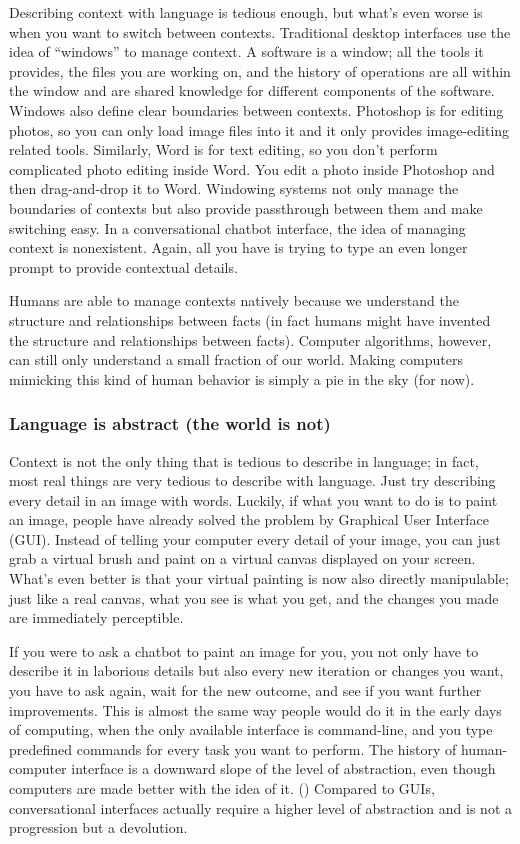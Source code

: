 \documentclass[12pt]{article}
\begin{document}
Describing context with language is tedious enough, but what's even worse is when you want to switch between contexts. Traditional desktop interfaces use the idea of ``windows'' to manage context. A software is a window; all the tools it provides, the files you are working on, and the history of operations are all within the window and are shared knowledge for different components of the software. Windows also define clear boundaries between contexts. Photoshop is for editing photos, so you can only load image files into it and it only provides image-editing related tools. Similarly, Word is for text editing, so you don't perform complicated photo editing inside Word. You edit a photo inside Photoshop and then drag-and-drop it to Word. Windowing systems not only manage the boundaries of contexts but also provide passthrough between them and make switching easy. In a conversational chatbot interface, the idea of managing context is nonexistent. Again, all you have is trying to type an even longer prompt to provide contextual details. 

Humans are able to manage contexts natively because we understand the structure and relationships between facts (in fact humans might have invented the structure and relationships between facts). Computer algorithms, however, can still only understand a small fraction of our world. Making computers mimicking this kind of human behavior is simply a pie in the sky (for now).

\subsubsection{Language is abstract (the world is not)}
Context is not the only thing that is tedious to describe in language; in fact, most real things are very tedious to describe with language. Just try describing every detail in an image with words. Luckily, if what you want to do is to paint an image, people have already solved the problem by Graphical User Interface (GUI). Instead of telling your computer every detail of your image, you can just grab a virtual brush and paint on a virtual canvas displayed on your screen. What's even better is that your virtual painting is now also directly manipulable; just like a real canvas, what you see is what you get, and the changes you made are immediately perceptible. 

If you were to ask a chatbot to paint an image for you, you not only have to describe it in laborious details but also every new iteration or changes you want, you have to ask again, wait for the new outcome, and see if you want further improvements. This is almost the same way people would do it in the early days of computing, when the only available interface is command-line, and you type predefined commands for every task you want to perform. The history of human-computer interface is a downward slope of the level of abstraction, even though computers are made better with the idea of it. (\cite{10.1162/1526381043320741}) Compared to GUIs, conversational interfaces actually require a higher level of abstraction and is not a progression but a devolution.
\end{document}
